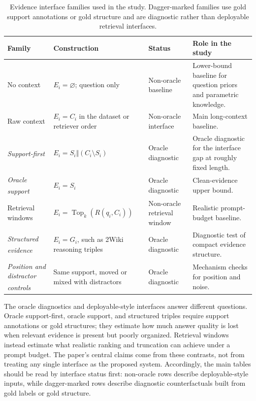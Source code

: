 \documentclass[a4paper,fleqn]{cas-sc}
\newcommand{\diagiface}[1]{\emph{#1}\textsuperscript{\dag}}
\begin{document}
\begin{table}[!htbp]
\centering
\caption{Evidence interface families used in the study. Dagger-marked families
use gold support annotations or gold structure and are diagnostic rather than
deployable retrieval interfaces.}
\label{tab:interface-families}
\small
\setlength{\tabcolsep}{3.2pt}
\begin{tabular}{>{\raggedright\arraybackslash}p{}
                >{\raggedright\arraybackslash}p{}
                >{\raggedright\arraybackslash}p{}
                >{\raggedright\arraybackslash}p{}}
\toprule
Family & Construction & Status & Role in the study \\
\midrule
No context & $E_i=\varnothing$; question only &
Non-oracle baseline &
Lower-bound baseline for question priors and parametric knowledge. \\
Raw context & $E_i=C_i$ in the dataset or retriever order &
Non-oracle interface &
Main long-context baseline. \\
\diagiface{Support-first} & $E_i=S_i \Vert (C_i \setminus S_i)$ &
Oracle diagnostic &
Oracle diagnostic for the interface gap at roughly fixed length. \\
\diagiface{Oracle support} & $E_i=S_i$ &
Oracle diagnostic &
Clean-evidence upper bound. \\
Retrieval windows & $E_i=\operatorname{Top}_k(R(q_i,C_i))$ &
Non-oracle retrieval window &
Realistic prompt-budget baseline. \\
\diagiface{Structured evidence} & $E_i=G_i$, such as 2Wiki reasoning triples &
Oracle diagnostic &
Diagnostic test of compact evidence structure. \\
\diagiface{Position and distractor controls} & Same support, moved or mixed with distractors &
Oracle diagnostic &
Mechanism checks for position and noise. \\
\bottomrule
\end{tabular}
\end{table}

The oracle diagnostics and deployable-style interfaces answer different
questions. Oracle support-first, oracle support, and structured triples require
support annotations or gold structures; they estimate how much answer quality
is lost when relevant evidence is present but poorly organized. Retrieval
windows instead estimate what realistic ranking and truncation can achieve
under a prompt budget. The paper's central claims come from these contrasts,
not from treating any single interface as the proposed system. Accordingly, the
main tables should be read by interface status first: non-oracle rows describe
deployable-style inputs, while dagger-marked rows describe diagnostic
counterfactuals built from gold labels or gold structure.
\end{document}
